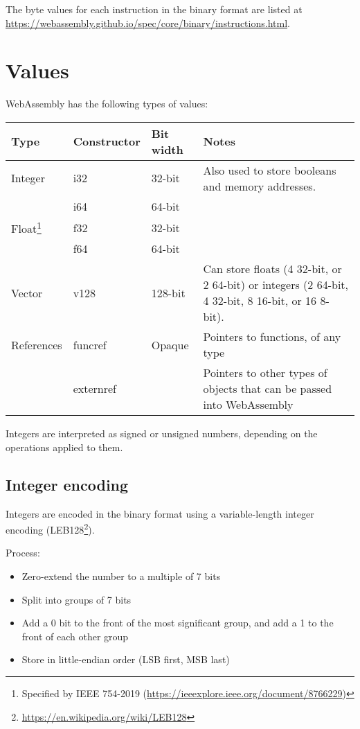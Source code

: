 \documentclass[10pt,a4paper]{article}
\begin{document}
The byte values for each instruction in the binary format are listed at \url{https://webassembly.github.io/spec/core/binary/instructions.html}.

\section*{Values}

WebAssembly has the following types of values:

\begin{tabularx}{\textwidth}{l>{\sffamily}llX}
\toprule
\textbf{Type} & \normalfont\textbf{Constructor} & \textbf{Bit width} & \textbf{Notes} \\
\midrule
Integer & i32 & 32-bit & Also used to store booleans and memory addresses. \\
& i64 & 64-bit \\
Float\footnote{Specified by IEEE 754-2019 (\url{https://ieeexplore.ieee.org/document/8766229})} & f32 & 32-bit \\
& f64 & 64-bit \\
Vector & v128 & 128-bit & Can store floats (4 32-bit, or 2 64-bit) or integers (2 64-bit, 4 32-bit, 8 16-bit, or 16 8-bit). \\
References & funcref & Opaque & Pointers to functions, of any type \\
& externref & & Pointers to other types of objects that can be passed into WebAssembly \\
\bottomrule
\end{tabularx}

Integers are interpreted as signed or unsigned numbers, depending on the operations applied to them.

\subsection*{Integer encoding}

Integers are encoded in the binary format using a variable-length integer encoding (LEB128\footnote{\url{https://en.wikipedia.org/wiki/LEB128}}).

Process:
\begin{itemize}
\item Zero-extend the number to a multiple of 7 bits
\item Split into groups of 7 bits
\item Add a 0 bit to the front of the most significant group, and add a 1 to the front of each other group
\item Store in little-endian order (LSB first, MSB last)
\end{itemize}
\end{document}

